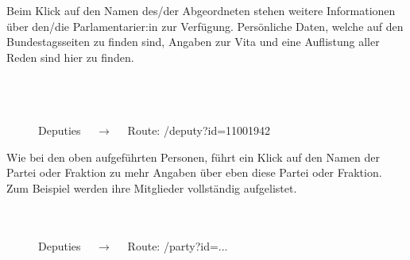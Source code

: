 \documentclass[10pt]{report}
\begin{document}
\noindent Beim Klick auf den Namen des/der Abgeordneten stehen weitere Informationen über den/die Parlamentarier:in zur Verfügung. Persönliche Daten, welche auf den Bundestagsseiten zu finden sind, Angaben zur Vita und eine Auflistung aller Reden sind hier zu finden.  \\\\\\\\

\begin{figure}[H]
	\begin{center}		
  	 \end{center}
	\caption{Deputies $\quad\rightarrow\quad$  Route:  /deputy?id=11001942}	
\end{figure}


\noindent Wie bei den oben aufgeführten Personen, führt ein Klick auf den Namen der Partei oder Fraktion zu mehr Angaben über eben diese Partei oder Fraktion. Zum Beispiel werden ihre Mitglieder vollständig aufgelistet. \\\\\\

\begin{figure}[H]
	\begin{center}		
  	 \end{center}
	\caption{Deputies $\quad\rightarrow\quad$  Route:  /party?id=...}	
\end{figure}
\end{document}
